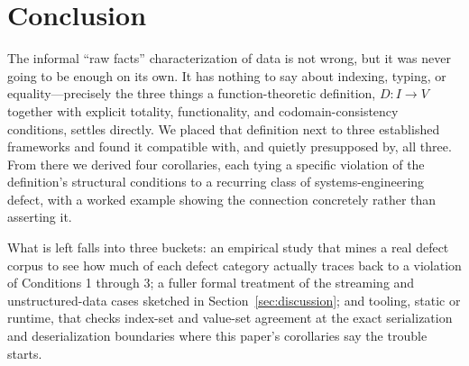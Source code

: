 \section{Conclusion}
\label{sec:conclusion}

The informal ``raw facts'' characterization of data is not wrong, but it
was never going to be enough on its own. It has nothing to say about
indexing, typing, or equality---precisely the three things a
function-theoretic definition, $D : I \to V$ together with explicit
totality, functionality, and codomain-consistency conditions, settles
directly. We placed that definition next to three established frameworks
and found it compatible with, and quietly presupposed by, all three. From
there we derived four corollaries, each tying a specific violation of the
definition's structural conditions to a recurring class of
systems-engineering defect, with a worked example showing the connection
concretely rather than asserting it.

What is left falls into three buckets: an empirical study that mines a
real defect corpus to see how much of each defect category actually
traces back to a violation of Conditions 1 through 3; a fuller formal
treatment of the streaming and unstructured-data cases sketched in
Section~\ref{sec:discussion}; and tooling, static or runtime, that checks
index-set and value-set agreement at the exact serialization and
deserialization boundaries where this paper's corollaries say the
trouble starts.